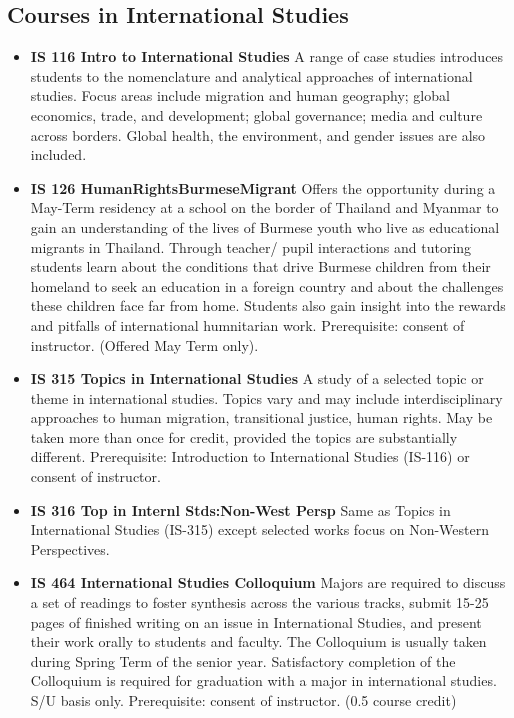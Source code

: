 \documentclass[
  letterpaper,
]{scrbook}
\providecommand{\tightlist}{%
  \setlength{\itemsep}{0pt}\setlength{\parskip}{0pt}}
\begin{document}
\subsection{Courses in International
Studies}\label{courses-in-international-studies}

\begin{itemize}
\tightlist
\item
  \textbf{IS 116 Intro to International Studies} A range of case studies
  introduces students to the nomenclature and analytical approaches of
  international studies. Focus areas include migration and human
  geography; global economics, trade, and development; global
  governance; media and culture across borders. Global health, the
  environment, and gender issues are also included.
\item
  \textbf{IS 126 HumanRightsBurmeseMigrant} Offers the opportunity
  during a May-Term residency at a school on the border of Thailand and
  Myanmar to gain an understanding of the lives of Burmese youth who
  live as educational migrants in Thailand. Through teacher/ pupil
  interactions and tutoring students learn about the conditions that
  drive Burmese children from their homeland to seek an education in a
  foreign country and about the challenges these children face far from
  home. Students also gain insight into the rewards and pitfalls of
  international humnitarian work. Prerequisite: consent of instructor.
  (Offered May Term only).
\item
  \textbf{IS 315 Topics in International Studies} A study of a selected
  topic or theme in international studies. Topics vary and may include
  interdisciplinary approaches to human migration, transitional justice,
  human rights. May be taken more than once for credit, provided the
  topics are substantially different. Prerequisite: Introduction to
  International Studies (IS-116) or consent of instructor.
\item
  \textbf{IS 316 Top in Internl Stds:Non-West Persp} Same as Topics in
  International Studies (IS-315) except selected works focus on
  Non-Western Perspectives.
\item
  \textbf{IS 464 International Studies Colloquium} Majors are required
  to discuss a set of readings to foster synthesis across the various
  tracks, submit 15-25 pages of finished writing on an issue in
  International Studies, and present their work orally to students and
  faculty. The Colloquium is usually taken during Spring Term of the
  senior year. Satisfactory completion of the Colloquium is required for
  graduation with a major in international studies. S/U basis only.
  Prerequisite: consent of instructor. (0.5 course credit)
\end{itemize}
\end{document}
